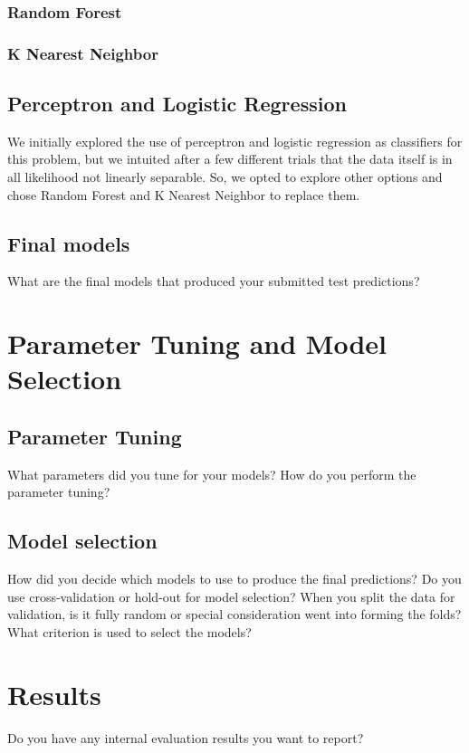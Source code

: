 \documentclass[11pt,a4paper]{article}
\begin{document}
\subsubsection{Random Forest}

\subsubsection{K Nearest Neighbor}

\subsection{Perceptron and Logistic Regression}
We initially explored the use of perceptron and logistic regression as classifiers for this problem, but we intuited after a few different trials that the data itself is in all likelihood not linearly separable. So, we opted to explore other options and chose Random Forest and K Nearest Neighbor to replace them.

\subsection{Final models}
What are the final models that produced your submitted test predictions?


\section{Parameter Tuning and Model Selection }

\subsection{Parameter Tuning}
What parameters did you tune for your models? How do you perform the parameter tuning?

\subsection{Model selection}
How did you decide which models to use to produce the final predictions?  Do you use cross-validation or hold-out for model selection? When you split the data for validation, is it fully random or special consideration went into forming the folds? What criterion is used to select the models?


\section{Results}
Do you have any internal evaluation results you want to report?
\end{document}
